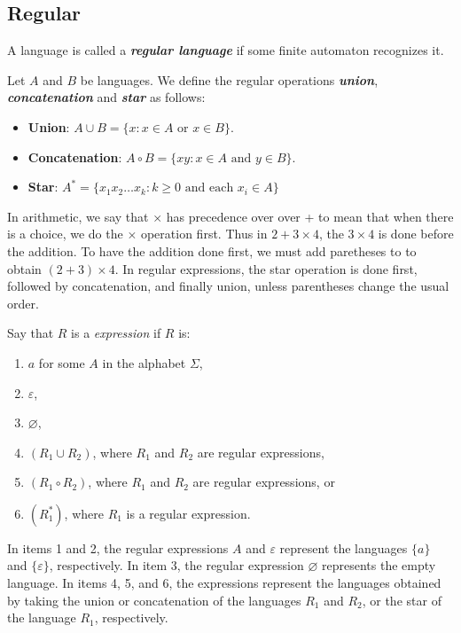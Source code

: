 \documentclass[12pt]{article}
\begin{document}
\subsection{Regular}
\label{sec:orgae52da3}
\begin{definition}[Regular]
  A language is called a \textit{\textbf{regular language}} if some finite
  automaton recognizes it.
\end{definition}

\begin{definition}
  Let $A$ and $B$ be languages. We define the regular operations
  \textit{\textbf{union}}, \textit{\textbf{concatenation}} and
  \textit{\textbf{star}} as follows:
  \begin{itemize}
    \item \textbf{Union}: $A \cup B=\{x : x\in A \text{ or } x\in B\}$.
    \item \textbf{Concatenation}: $A \circ B=\{xy : x\in A \text{ and } y\in
    B\}$.
    \item \textbf{Star}: $A^*=\{x_1x_2\dots x_k : k\ge0 \text{ and each }
    x_i\in A\}$
  \end{itemize}
  In arithmetic, we say that $\times$ has precedence over over + to mean that
  when there is a choice, we do the $\times$ operation first. Thus in
  $2+3\times4$, the $3\times4$ is done before the addition. To have the
  addition done first, we must add paretheses to to obtain $(2+3)\times4$. In
  regular expressions, the star operation is done first, followed by
  concatenation, and finally union, unless parentheses change the usual
  order.
\end{definition}

\begin{definition}
  Say that $R$ is a {\textit{\textbfregular expression}} if $R$ is:
  \begin{enumerate}
    \item $a$ for some $A$ in the alphabet $\Sigma$,
    \item $\varepsilon$,
    \item $\varnothing$,
    \item $(R_1 \cup R_2)$, where $R_1$ and $R_2$ are regular expressions,
    \item $(R_1 \circ R_2)$, where $R_1$ and $R_2$ are regular expressions, or
    \item $(R_1^*)$, where $R_1$ is a regular expression.
  \end{enumerate}
  In items 1 and 2, the regular expressions $A$ and $\varepsilon$ represent the
  languages $\{a\}$ and $\{\varepsilon\}$, respectively. In item 3, the regular
  expression $\varnothing$ represents the empty language. In items 4, 5, and 6,
  the expressions represent the languages obtained by taking the union or
  concatenation of the languages $R_1$ and $R_2$, or the star of the language
  $R_1$, respectively.
\end{definition}
\end{document}
